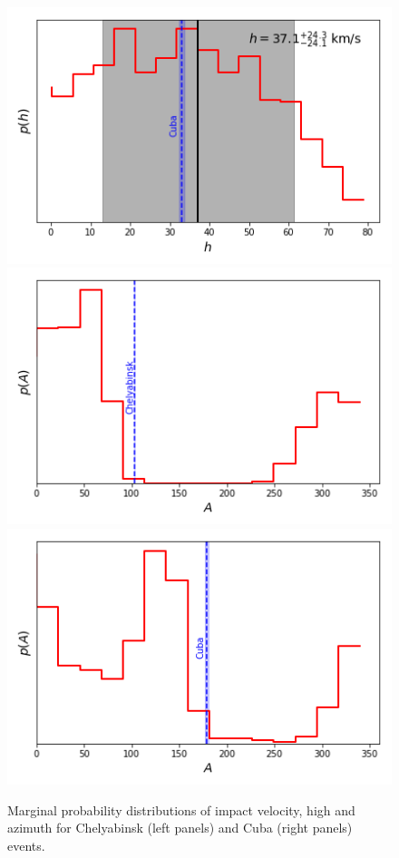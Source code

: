 \documentclass[fleqn,usenatbib]{mnras}
\begin{document}
\begin{figure}
   \includegraphics[scale=0.38]{h-ppd-Cuba.png}
   \\
   \includegraphics[scale=0.38]{Az-ppd-Chelyabinsk.png}\hspace{0.1em}%
   \includegraphics[scale=0.38]{Az-ppd-Cuba.png}
  \caption{Marginal probability distributions of impact velocity, high and azimuth for Chelyabinsk (left panels) and Cuba (right panels) events.}
\label{fig:marginal}
\end{figure}
\end{document}
